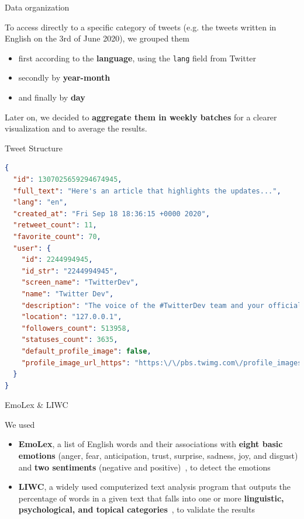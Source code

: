 \documentclass[9pt,aspectratio=1610]{beamer}  %
\begin{document}
\begin{frame}{Data organization}

	To access directly to a specific category of tweets (e.g. the tweets written in English on the 3rd of June 2020), we grouped them 
	
	\begin{itemize}
	    \item first according to the \textbf{language}, using the \texttt{lang} field from Twitter
	    \item secondly by \textbf{year-month}
	    \item and finally by \textbf{day}
	\end{itemize}
	
    Later on, we decided to \textbf{aggregate them in weekly batches} for a clearer visualization and to average the results.

\end{frame}

\begin{frame}{Tweet Structure}
	
    \begin{lstlisting}[language=json, caption={Final json object for a tweet}, captionpos=b, label={lst:tweet_json}]
{
  "id": 1307025659294674945,
  "full_text": "Here's an article that highlights the updates...",
  "lang": "en",
  "created_at": "Fri Sep 18 18:36:15 +0000 2020",
  "retweet_count": 11,
  "favorite_count": 70,
  "user": {
    "id": 2244994945,
    "id_str": "2244994945",
    "screen_name": "TwitterDev",
    "name": "Twitter Dev",
    "description": "The voice of the #TwitterDev team and your official...",
    "location": "127.0.0.1",
    "followers_count": 513958,
    "statuses_count": 3635,
    "default_profile_image": false,
    "profile_image_url_https": "https:\/\/pbs.twimg.com\/profile_images\/1283786620521652229\/lEODkLTh_normal.jpg"
  }
}
    \end{lstlisting}
	
\end{frame}

\begin{frame}{EmoLex \& LIWC}

    We used
    
    \begin{itemize}
        \item \textbf{EmoLex}, a list of English words and their associations with \textbf{eight basic emotions} (anger, fear, anticipation, trust, surprise, sadness, joy, and disgust) and \textbf{two sentiments} (negative and positive)~\autocite{ncrwebsite}, to detect the emotions
        \item \textbf{LIWC}, a widely used computerized text analysis program that outputs the percentage of words in a given text that falls into one or more \textbf{linguistic, psychological, and topical categories}~\autocite{liwcwebsite}, to validate the results
    \end{itemize}

\end{frame}
\end{document}
